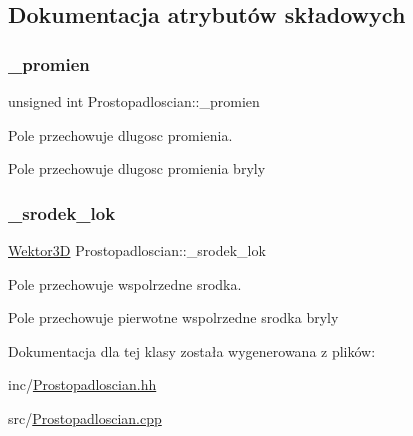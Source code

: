\subsection{Dokumentacja atrybutów składowych}
\mbox{\label{classProstopadloscian_a06187a64d02fff11fc99e749abcef125}} 
\subsubsection{\texorpdfstring{\+\_\+promien}{\_promien}}
{\footnotesize\ttfamily unsigned int Prostopadloscian\+::\+\_\+promien\hspace{0.3cm}{\ttfamily [private]}}



Pole przechowuje dlugosc promienia. 

Pole przechowuje dlugosc promienia bryly \mbox{\label{classProstopadloscian_a3aac0fbd53f5add1fe4e802204e7f609}} 
\subsubsection{\texorpdfstring{\+\_\+srodek\+\_\+lok}{\_srodek\_lok}}
{\footnotesize\ttfamily \hyperlink{classSWektor}{Wektor3D} Prostopadloscian\+::\+\_\+srodek\+\_\+lok\hspace{0.3cm}{\ttfamily [private]}}



Pole przechowuje wspolrzedne srodka. 

Pole przechowuje pierwotne wspolrzedne srodka bryly 

Dokumentacja dla tej klasy została wygenerowana z plików\+:\begin{DoxyCompactItemize}
\item 
inc/\hyperlink{Prostopadloscian_8hh}{Prostopadloscian.\+hh}\item 
src/\hyperlink{Prostopadloscian_8cpp}{Prostopadloscian.\+cpp}\end{DoxyCompactItemize}
